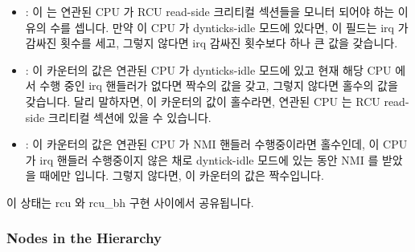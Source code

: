 \begin{itemize}
\item	{}:
	이  는 연관된 CPU 가 RCU read-side 크리티컬 섹션들을 모니터
	되어야 하는 이유의 수를 셉니다.
	만약 이 CPU 가 dynticks-idle 모드에 있다면, 이 필드는 irq 가 감싸진
	횟수를 세고, 그렇지 않다면 irq 감싸진 횟수보다 하나 큰 값을 갖습니다.
\item	{}:
	이  카운터의 값은 연관된 CPU 가 dynticks-idle 모드에 있고 현재
	해당 CPU 에서 수행 중인 irq 핸들러가 없다면 짝수의 값을 갖고, 그렇지
	않다면 홀수의 값을 갖습니다.
	달리 말하자면, 이 카운터의 값이 홀수라면, 연관된 CPU 는 RCU read-side
	크리티컬 섹션에 있을 수 있습니다.
\item	{}:
	이  카운터의 값은 연관된 CPU 가 NMI 핸들러 수행중이라면
	홀수인데, 이 CPU 가 irq 핸들러 수행중이지 않은 채로 dyntick-idle 모드에
	있는 동안 NMI 를 받았을 때에만 입니다.
	그렇지 않다면, 이 카운터의 값은 짝수입니다.
\iffalse

\item	\co{dynticks_nesting}:
	This \co{int} counts the number of reasons that the corresponding
	CPU should be monitored for RCU read-side critical sections.
	If the CPU is in dynticks-idle mode, then this counts the
	irq nesting level, otherwise it is one greater than the
	irq nesting level.
\item	\co{dynticks}:
	This \co{int} counter's value is even if the corresponding CPU is
	in dynticks-idle mode and there are no irq handlers currently
	running on that CPU, otherwise the counter's value is odd.
	In other words, if this counter's value is odd, then the
	corresponding CPU might be in an RCU read-side critical section.
\item	\co{dynticks_nmi}:
	This \co{int} counter's value is odd if the corresponding CPU is
	in an NMI handler, but only if the NMI arrived while this
	CPU was in dyntick-idle mode with no irq handlers running.
	Otherwise, the counter's value will be even.
\fi
\end{itemize}

이 상태는 rcu 와 rcu\_bh 구현 사이에서 공유됩니다.
\iffalse

This state is shared between the rcu and rcu\_bh implementations.
\fi

\subsubsection{Nodes in the Hierarchy}
\label{app:rcuimpl:rcutreewt:Nodes in the Hierarchy}

